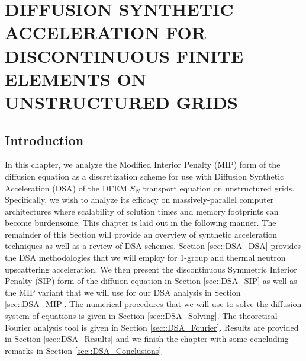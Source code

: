 %
%
%
\chapter{\uppercase {Diffusion Synthetic Acceleration for Discontinuous Finite Elements on Unstructured Grids}}
\label{sec::DSA}

\section{Introduction}
\label{sec::DSA_Introduction}

In this chapter, we analyze the Modified Interior Penalty (MIP) form of the diffusion equation as a discretization scheme for use with Diffusion Synthetic Acceleration (DSA) of the DFEM $S_N$ transport equation on unstructured grids. Specifically, we wish to analyze its efficacy on massively-parallel computer architectures where scalability of solution times and memory footprints can become burdensome. This chapter is laid out in the following manner. The remainder of this Section will provide an overview of synthetic acceleration techniques as well as a review of DSA schemes. Section \ref{sec::DSA_DSA} provides the DSA methodologies that we will employ for 1-group and thermal neutron upscattering acceleration. We then present the discontinuous Symmetric Interior Penalty (SIP) form of the diffuion equation in Section \ref{sec::DSA_SIP} as well as the MIP variant that we will use for our DSA analysis in Section \ref{sec::DSA_MIP}. The numerical procedures that we will use to solve the diffusion system of equations is given in Section \ref{sec::DSA_Solving}. The theoretical Fourier analysis tool is given in Section \ref{sec::DSA_Fourier}. Results are provided in Section \ref{sec::DSA_Results} and we finish the chapter with some concluding remarks in Section \ref{sec::DSA_Conclusions}

